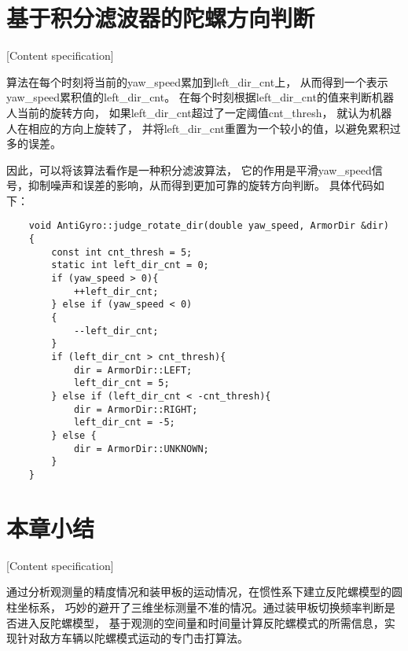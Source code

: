 \section{基于积分滤波器的陀螺方向判断}[Content specification]

算法在每个时刻将当前的yaw\_speed累加到left\_dir\_cnt上，
从而得到一个表示yaw\_speed累积值的left\_dir\_cnt。
在每个时刻根据left\_dir\_cnt的值来判断机器人当前的旋转方向，
如果left\_dir\_cnt超过了一定阈值cnt\_thresh，
就认为机器人在相应的方向上旋转了，
并将left\_dir\_cnt重置为一个较小的值，以避免累积过多的误差。

因此，可以将该算法看作是一种积分滤波算法，
它的作用是平滑yaw\_speed信号，抑制噪声和误差的影响，从而得到更加可靠的旋转方向判断。
具体代码如下：

\begin{lstlisting}
    void AntiGyro::judge_rotate_dir(double yaw_speed, ArmorDir &dir)
    {
        const int cnt_thresh = 5;
        static int left_dir_cnt = 0;
        if (yaw_speed > 0){
            ++left_dir_cnt;
        } else if (yaw_speed < 0)
        {
            --left_dir_cnt;
        } 
        if (left_dir_cnt > cnt_thresh){
            dir = ArmorDir::LEFT;
            left_dir_cnt = 5;
        } else if (left_dir_cnt < -cnt_thresh){    
            dir = ArmorDir::RIGHT;
            left_dir_cnt = -5;
        } else {
            dir = ArmorDir::UNKNOWN;
        }
    }
\end{lstlisting}


\section{本章小结}[Content specification]

通过分析观测量的精度情况和装甲板的运动情况，在惯性系下建立反陀螺模型的圆柱坐标系，
巧妙的避开了三维坐标测量不准的情况。通过装甲板切换频率判断是否进入反陀螺模型，
基于观测的空间量和时间量计算反陀螺模式的所需信息，实现针对敌方车辆以陀螺模式运动的专门击打算法。
